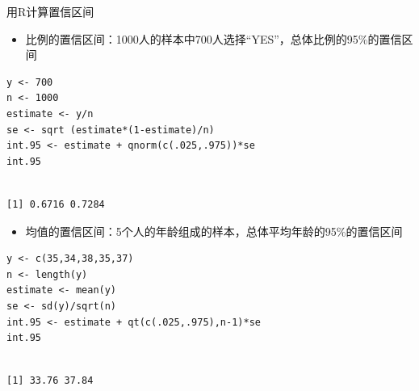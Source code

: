 \documentclass[presentation]{beamer}
\begin{document}
\begin{frame}[fragile,label={sec:org9461419}]{用R计算置信区间}
 \begin{itemize}
\item 比例的置信区间：1000人的样本中700人选择“YES”，总体比例的95\%的置信区间
\end{itemize}
\begin{verbatim}
y <- 700
n <- 1000
estimate <- y/n
se <- sqrt (estimate*(1-estimate)/n)
int.95 <- estimate + qnorm(c(.025,.975))*se
int.95
\end{verbatim}

\begin{verbatim}

[1] 0.6716 0.7284
\end{verbatim}

\begin{itemize}
\item 均值的置信区间：5个人的年龄组成的样本，总体平均年龄的95\%的置信区间
\end{itemize}
\begin{verbatim}
y <- c(35,34,38,35,37)
n <- length(y)
estimate <- mean(y)
se <- sd(y)/sqrt(n)
int.95 <- estimate + qt(c(.025,.975),n-1)*se
int.95
\end{verbatim}

\begin{verbatim}

[1] 33.76 37.84
\end{verbatim}
\end{frame}
\end{document}
